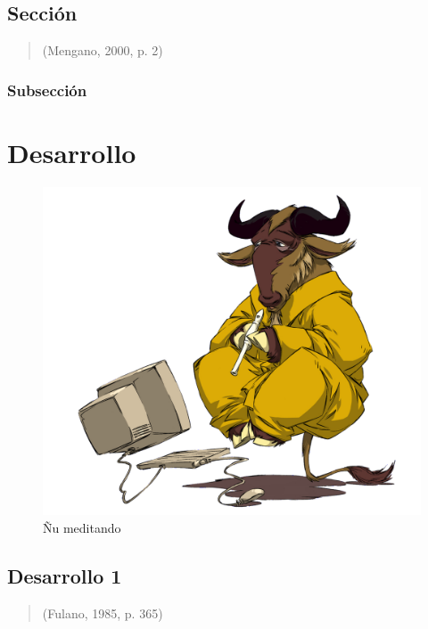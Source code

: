 \documentclass[12pt,letterpaper,oneside]{report}
\begin{document}
\lipsum[1-4]

\section{Sección}

\lipsum[1-3]

\begin{quote}
	\lipsum[1] (Mengano, 2000, p. 2)
\end{quote}

\subsection{Subsección}

\lipsum[4-6]


\chapter{Desarrollo}


\lipsum[1-4]

\begin{figure}[ht!]
	\label{img1}
	\caption{Ñu meditando}
	\centering	\includegraphics[width=.8\textwidth]{linuximagen}
\end{figure}

\section{Desarrollo 1}

\lipsum[1-2]

\begin{quote}
	\lipsum[1] (Fulano, 1985, p. 365)
\end{quote}
\end{document}

